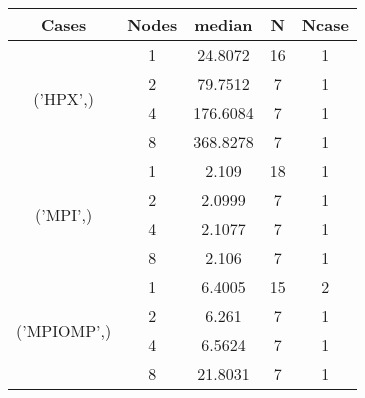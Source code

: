 \begin{tabular}{ccccc}
\hline
Cases & Nodes& median & N & Ncase \\
\hline
\multirow{4}{*}{('HPX',)}& 1& 24.8072& 16& 1\\
& 2& 79.7512& 7& 1\\
& 4& 176.6084& 7& 1\\
& 8& 368.8278& 7& 1\\
\hline
\multirow{4}{*}{('MPI',)}& 1& 2.109& 18& 1\\
& 2& 2.0999& 7& 1\\
& 4& 2.1077& 7& 1\\
& 8& 2.106& 7& 1\\
\hline
\multirow{4}{*}{('MPIOMP',)}& 1& 6.4005& 15& 2\\
& 2& 6.261& 7& 1\\
& 4& 6.5624& 7& 1\\
& 8& 21.8031& 7& 1\\
\hline
\end{tabular}
